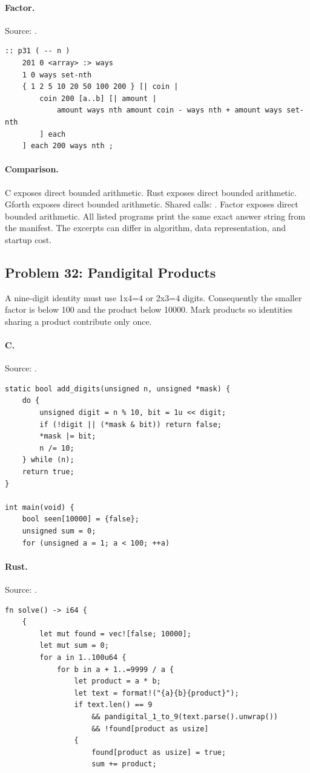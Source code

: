 \paragraph{Factor.} Source: .
\begin{lstlisting}
:: p31 ( -- n )
    201 0 <array> :> ways
    1 0 ways set-nth
    { 1 2 5 10 20 50 100 200 } [| coin |
        coin 200 [a..b] [| amount |
            amount ways nth amount coin - ways nth + amount ways set-nth
        ] each
    ] each 200 ways nth ;
\end{lstlisting}

\paragraph{Comparison.}
C exposes direct bounded arithmetic. Rust exposes direct bounded arithmetic. Gforth exposes direct bounded arithmetic. Shared calls: \texttt{}. Factor exposes direct bounded arithmetic.
All listed programs print the same exact answer string from the manifest. The excerpts can differ in algorithm, data representation, and startup cost.

\subsection{Problem 32: Pandigital Products}
\label{walkthrough:p32}
A nine-digit identity must use 1x4=4 or 2x3=4 digits. Consequently the smaller factor is below 100 and the product below 10000. Mark products so identities sharing a product contribute only once.

\paragraph{C.} Source: .
\begin{lstlisting}
static bool add_digits(unsigned n, unsigned *mask) {
    do {
        unsigned digit = n % 10, bit = 1u << digit;
        if (!digit || (*mask & bit)) return false;
        *mask |= bit;
        n /= 10;
    } while (n);
    return true;
}

int main(void) {
    bool seen[10000] = {false};
    unsigned sum = 0;
    for (unsigned a = 1; a < 100; ++a)
\end{lstlisting}

\paragraph{Rust.} Source: .
\begin{lstlisting}
fn solve() -> i64 {
    {
        let mut found = vec![false; 10000];
        let mut sum = 0;
        for a in 1..100u64 {
            for b in a + 1..=9999 / a {
                let product = a * b;
                let text = format!("{a}{b}{product}");
                if text.len() == 9
                    && pandigital_1_to_9(text.parse().unwrap())
                    && !found[product as usize]
                {
                    found[product as usize] = true;
                    sum += product;
\end{lstlisting}

